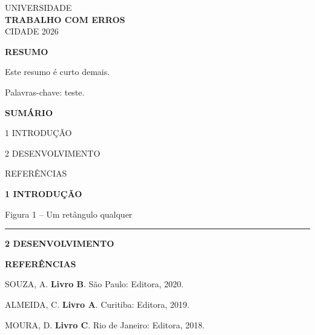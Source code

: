 \documentclass[11pt,a4paper]{article}
\newcommand{\titulo}[1]{\begin{center}\textbf{#1}\end{center}}
\begin{document}
\pagestyle{empty}
\begin{center}UNIVERSIDADE\\[8cm]\textbf{TRABALHO COM ERROS}\\[8cm]CIDADE 2026\end{center}\newpage
\titulo{RESUMO}
Este resumo é curto demais. \par Palavras-chave: teste.\newpage
\titulo{SUMÁRIO}
1 INTRODUÇÃO\par
2 DESENVOLVIMENTO\par
REFERÊNCIAS\par
\newpage
\pagestyle{plain}\setcounter{page}{3}
\textbf{1 INTRODUÇÃO}\par
\lipsum[1-3]
\begin{center}Figura 1 – Um retângulo qualquer\\ \rule{6cm}{3cm}\end{center}
\lipsum[4]\par
\textbf{2 DESENVOLVIMENTO}\par
\lipsum[5-7]
\newpage
\textbf{REFERÊNCIAS}\par
SOUZA, A. \textbf{Livro B}. São Paulo: Editora, 2020.\par
ALMEIDA, C. \textbf{Livro A}. Curitiba: Editora, 2019.\par
MOURA, D. \textbf{Livro C}. Rio de Janeiro: Editora, 2018.\par
\end{document}
